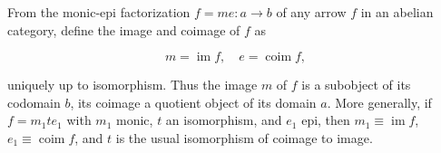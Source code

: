 From the monic-epi factorization $f = me : a \rightarrow b$ of any arrow $f$ in an abelian category, define the image and coimage of $f$ as

$$m = \operatorname{im} f, \quad e = \operatorname{coim} f,$$

uniquely up to isomorphism. Thus the image $m$ of $f$ is a subobject of its codomain $b$, its coimage a quotient object of its domain $a$. More generally, if $f = m_1 t e_1$ with $m_1$ monic, $t$ an isomorphism, and $e_1$ epi, then $m_1 \equiv \operatorname{im} f$, $e_1 \equiv \operatorname{coim} f$, and $t$ is the usual isomorphism of coimage to image.

